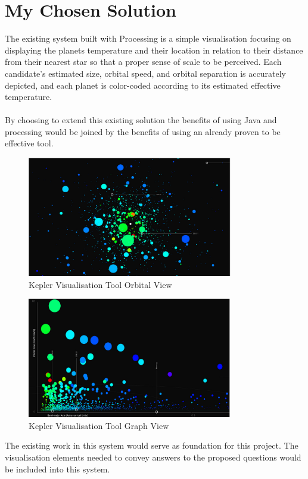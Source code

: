 \documentclass[11pt
              , a4paper
              , twoside
              , openright
              ]{report}
\begin{document}
\section{My Chosen Solution}
The existing system built with Processing is a simple visualisation focusing on displaying the planets temperature and their location in relation to their distance from their nearest star so that a proper sense of scale to be perceived. Each candidate’s estimated size, orbital speed, and orbital separation is accurately depicted, and each planet is color-coded according to its estimated effective temperature.
\\\\
By choosing to extend this existing solution the benefits of using Java and processing would be joined by the benefits of using an already proven to be effective tool. 
\begin{figure}[h!]
  \centering
      \includegraphics[width=0.8\textwidth]{images/kepler_orbital.jpg}
  \caption{Kepler Visualisation Tool Orbital View}
\end{figure}
\begin{figure}[h!]
  \centering
      \includegraphics[width=0.8\textwidth]{images/kepler_graph.jpg}
  \caption{Kepler Visualisation Tool Graph View}
\end{figure}
The existing work in this system would serve as foundation for this project. The visualisation elements needed to convey answers to the proposed questions would be included into this system.
\end{document}
